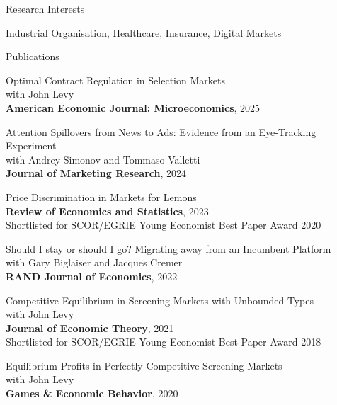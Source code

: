 \documentclass{resume}
\begin{document}
\begin{rSection}{Research Interests}

Industrial Organisation, Healthcare, Insurance, Digital Markets
	
\end{rSection}









\begin{rSection}{Publications}

\begin{etaremune}

\item Optimal Contract Regulation in Selection Markets \\
with John Levy\\ \textbf{American Economic Journal: Microeconomics}, 2025

\item Attention Spillovers from News to Ads: Evidence from an Eye-Tracking Experiment \\ 
with Andrey Simonov and Tommaso Valletti\\ \textbf{Journal of Marketing Research}, 2024

\item Price Discrimination in Markets for Lemons \\ 
\textbf{Review of Economics and Statistics}, 2023 \\
Shortlisted for SCOR/EGRIE Young Economist Best Paper Award 2020

\item Should I stay or should I go? Migrating away from an Incumbent Platform \\ 
with Gary Biglaiser and Jacques Cremer \\ 
\textbf{RAND Journal of Economics}, 2022

\item Competitive Equilibrium in Screening Markets with Unbounded Types\\ 
with John Levy \\
\textbf{Journal of Economic Theory}, 2021
\\ Shortlisted for SCOR/EGRIE Young Economist Best Paper Award 2018

\item Equilibrium Profits in Perfectly Competitive Screening Markets\\
with John Levy \\
\textbf{Games \& Economic Behavior}, 2020


\end{etaremune}
\end{rSection}
\end{document}

